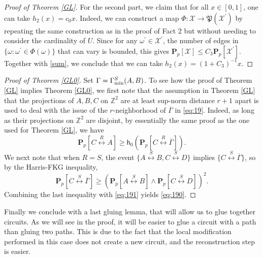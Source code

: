 \documentclass[12pt, twoside,a4paper,reqno]{amsart}
\theoremstyle{plain}
\theoremstyle{remark}
\theoremstyle{definition}
\newcommand{\PP}{\mathbf{P}}
\newcommand{\Pp}[1]{\PP_p \left [ #1 \right ]}
\newcommand{\lr}[1][]{\overset{\:#1\:}\longleftrightarrow}
\renewcommand{\bar}{\overline}
\begin{document}
\begin{proof} [Proof of Theorem \ref{GL}]
For the second part, we claim that for all $x\in \left[ 0,1\right] $, one can take $%
h_{2}\left( x\right) =c_{0}x$. Indeed, we can construct a map $\Phi :%
\mathcal{X}\rightarrow \mathfrak{P}(\mathcal{X}^{\prime })$ by repeating the same construction as
in the proof of Fact 2 but without needing to consider the cardinality of $U$. Since for any $\omega
^{\prime } \in \mathcal{X}^{\prime }$, the number of edges in $\{ \omega:
\omega ^{\prime } \in \Phi (\omega)\}$
that can vary is bounded, this gives $\mathbf{P}_{p}\left[ \mathcal{X}\right]
\leq C_{3}\mathbf{P}_{p}\left[ \mathcal{X}^{\prime }\right] $. Together with
\eqref{sum}, we conclude that we can take $h_{2}\left( x\right) =\left( 1+C_{3}\right)
^{-1}x$.
\end{proof}

\begin{proof}[Proof of Theorem \ref{GL0}]
  Set $\Gamma=\Gamma^S_{\rm min}(A,B)$. To see how the proof of Theorem \ref{GL}
  implies Theorem \ref{GL0}, we first note that the assumption in Theorem
  \ref{GL} that the projections of $A,B,C$ on $\mathds{Z}^{2}$ are at least
  sup-norm distance $r+1$ apart is used to deal with the issue of the
  $r$-neighborhood of $\bar \Gamma$ in \eqref{eq:19}. Indeed, as long as their
  projections on $\mathds{Z}^{2}$ are disjoint, by essentially the same proof as
 the one used for Theorem \ref{GL}, we have
\begin{equation}
    \label{eq:191}
    \Pp{C\lr[R] A}\ge \mathsf{h}_0( \Pp{C\lr[R] \bar \Gamma}).
  \end{equation}
We next note that when $R = S$, the event $\{A\lr[S] B, C\lr[S]D\}$
implies $\{C\lr[S] \bar \Gamma\}$, so by the Harris-FKG inequality,
\[ \Pp{C\lr[S] \bar \Gamma} \geq  (\Pp{A\lr[S] B}\wedge   \Pp{C\lr[S]D})^2. \]
Combining the last inequality with \eqref{eq:191} yields \eqref{eq:190}.
\end{proof}

Finally we conclude with a last gluing lemma, that will allow us to glue
together circuits. As we will see in the proof, it will be easier to glue a
circuit with a path than gluing two paths. This is due to the fact that the
local modification performed in this case does not create a new circuit, and the
reconstruction step is easier.
\end{document}
